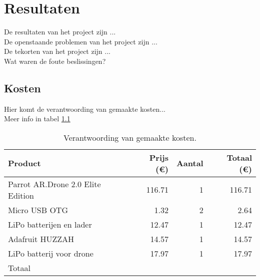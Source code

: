 \chapter{Resultaten}
De resultaten van het project zijn ...\\

De openstaande problemen van het project zijn ...\\

De tekorten van het project zijn ...\\

Wat waren de foute beslissingen?

\section{Kosten}
Hier komt de verantwoording van gemaakte kosten...\\

Meer info in tabel \ref{tab:kosten}
\begin{table}[p]
\centering
\begin{tabular}{ |l|r|r|r| } \hline
Product & Prijs (\euro{}) & Aantal & Totaal (\euro{}) \\ [.5ex] \hline \hline
Parrot AR.Drone 2.0 Elite Edition & 116.71 & 1 & 116.71 \\ \hline
Micro USB OTG & 1.32 & 2 & 2.64 \\ \hline
LiPo batterijen en lader & 12.47 & 1 & 12.47 \\ \hline
Adafruit HUZZAH & 14.57 & 1 & 14.57 \\ \hline
LiPo batterij voor drone & 17.97 & 1 & 17.97 \\ \hline
Totaal & & &  \\ \hline
\end{tabular}
\caption[Kosten]{Verantwoording van gemaakte kosten.}
\label{tab:kosten}
\end{table}
